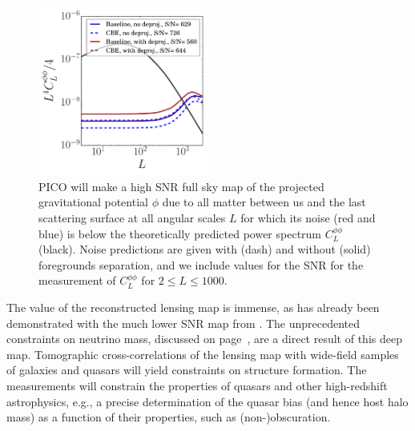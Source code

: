 \documentclass[PICOReport.tex]{subfiles}
\begin{document}

\begin{figure}
\hspace{-0.2in}
\parbox{3.0in}{\centerline {
\includegraphics[width=2.2in]{images/lensingNoisePICO.pdf} } }
\hspace{0.in}
\parbox{3.3in}{
\caption{\captiontext 
PICO will make a high \ac{SNR} full sky map of the projected gravitational potential $\phi$ due to all matter between us and the last scattering surface at all angular scales $L$ for which its noise (red and blue) is below the 
theoretically predicted power spectrum $C_{L}^{\phi \phi}$ (black). Noise predictions are given with (dash) and without (solid) foregrounds separation, and we include values for the \ac{SNR} for the measurement of $C_{L}^{\phi \phi}$ for 
$2 \leq L \leq 1000$. 
\label{fig:lensingNoisePICO} 
} }
\vspace{-0.1in}
\end{figure}

The value of the reconstructed lensing map is immense, as has already been demonstrated with the much lower \ac{SNR} map from \planck . The unprecedented constraints on neutrino mass, discussed on page~\pageref{neutrino_fundamental}, are a direct result of this deep map. Tomographic cross-correlations of the lensing map with wide-field samples of galaxies and quasars will yield constraints on structure formation. The measurements will constrain the properties of quasars and other high-redshift astrophysics, e.g., a precise determination of the quasar bias (and hence host halo mass) as a function of their properties, such as (non-)obscuration. 
\end{document}
